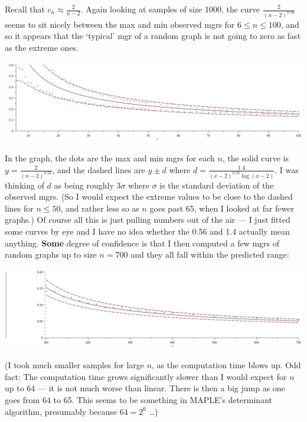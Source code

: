 \documentclass[12pt]{article}
\begin{document}
Recall that $c_n \approx \frac{2}{n-2}$. Again looking at samples of size 1000, the curve $\frac{2}{(n-2)^{0.56}}$ seems to sit nicely between the max and min observed mgrs for $6 \le n \le 100$, and so it appears that the `typical' mgr of a random graph is not going to zero as fast as the extreme ones.

\begin{center}
\includegraphics[width=15cm]{max-min-mgrs.jpg}
\end{center}

In the graph, the dots are the max and min mgrs for each $n$, the solid curve is $y = \frac{2}{(n-2)^{0.56}}$, and the dashed lines are $y\pm d$ where $d = \frac{1.4}{(x-2)^{0.56}\log(x-2)}$. I was thinking of $d$ as being roughly $3\sigma$ where $\sigma$ is the standard deviation of the observed mgrs. (So I would expect the extreme values to be close to the dashed lines for $n \le 50$, and rather less so as $n$ goes past 65, when I looked at far fewer graphs.) Of course all this is just pulling numbers out of the air --- I just fitted some curves by eye and I have no idea whether the 0.56 and 1.4 actually mean anything. \textbf{Some} degree of confidence is that I then computed a few mgrs of random graphs up to size $n = 700$ and they all fall within the predicted range:

\begin{center}
\includegraphics[width=15cm]{max-min-mgrs-ext.jpg}
\end{center}

(I took much smaller samples for large $n$, as the computation time blows up. Odd fact: The computation time grows significantly slower than I would expect for $n$ up to 64 --- it is not much worse than linear. There is then a big jump as one goes from 64 to 65. This seems to be something in MAPLE's determinant algorithm, presumably because $64 = 2^6$ \dots)
\end{document}
